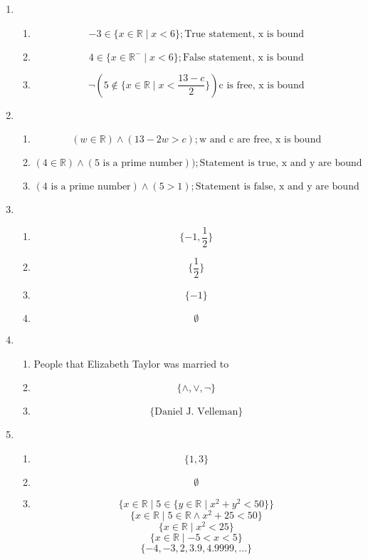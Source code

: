 \begin{enumerate}
\begin{enumerate}
    \end{enumerate}
    \item 
    \begin{enumerate}
        \item \[-3 \in \{x \in \mathbb{R} \mid x < 6\}; \text{True statement, x is bound}\]
        \item \[4 \in \{x \in \mathbb{R}^- \mid x < 6\}; \text{False statement, x is bound}\]
        \item \[\lnot(5\notin\{x\in\mathbb{R}\mid x < \frac{13 - c}{2}\}) \text{c is free, x is bound}\]
    \end{enumerate}
    \item 
    \begin{enumerate}
        \item \[(w\in\mathbb{R})\land(13 -2w > c); \text{w and c are free, x is bound}\]
        \item \[(4\in\mathbb{R})\land(5 \text{ is a prime number})); \text{Statement is true, x and y are bound}\]
        \item \[(4 \text{ is a prime number}) \land (5 > 1); \text{Statement is false, x and y are bound}\]
    \end{enumerate}
    \item 
    \begin{enumerate}
        \item \[\{-1,\frac{1}{2}\}\]
        \item \[\{\frac{1}{2}\}\]
        \item \[\{-1\}\]
        \item \[\emptyset\]
    \end{enumerate}
    \item 
    \begin{enumerate}
        \item People that Elizabeth Taylor was married to
        \item \[\{\land,\lor,\lnot\}\]
        \item \[\{\text{Daniel J. Velleman}\}\]
    \end{enumerate}
    \item 
    \begin{enumerate}
        \item \[\{1,3\}\]
        \item \[\emptyset\]
        \item \[\{x \in \mathbb{R} \mid 5 \in \{y \in \mathbb{R} \mid x^2+y^2<50\}\}\]
        \[\{x \in \mathbb{R} \mid 5 \in \mathbb{R} \land x^2 + 25 < 50\}\]
        \[\{x \in \mathbb{R} \mid x^2 < 25\}\]
        \[\{x \in \mathbb{R} \mid -5 < x < 5\}\]
        \[\{-4, -3, 2, 3.9, 4.9999, ...\}\]
    \end{enumerate}
\end{enumerate}
